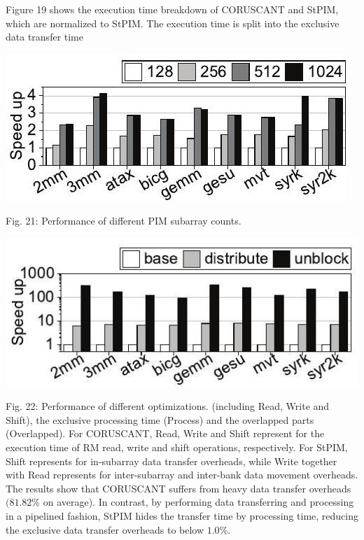 \documentclass[10pt]{article}
\begin{document}
Figure 19 shows the execution time breakdown of CORUSCANT and StPIM, which are normalized to StPIM. The execution time is split into the exclusive data transfer time

\begin{center}
\includegraphics[max width=\textwidth]{2024_05_12_abeba8a85da5b5ec4c7bg-11}
\end{center}

Fig. 21: Performance of different PIM subarray counts.

\begin{center}
\includegraphics[max width=\textwidth]{2024_05_12_abeba8a85da5b5ec4c7bg-11(1)}
\end{center}

Fig. 22: Performance of different optimizations. (including Read, Write and Shift), the exclusive processing time (Process) and the overlapped parts (Overlapped). For CORUSCANT, Read, Write and Shift represent for the execution time of RM read, write and shift operations, respectively. For StPIM, Shift represents for in-subarray data transfer overheads, while Write together with Read represents for inter-subarray and inter-bank data movement overheads. The results show that CORUSCANT suffers from heavy data transfer overheads $(81.82 \%$ on average). In contrast, by performing data transferring and processing in a pipelined fashion, StPIM hides the transfer time by processing time, reducing the exclusive data transfer overheads to below $1.0 \%$.
\end{document}
